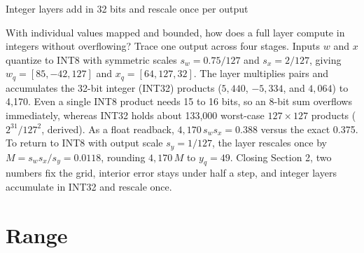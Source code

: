 \documentclass[aspectratio=169, 12pt]{beamer}
\begin{document}
\begin{frame}{Integer layers add in 32 bits and rescale once per output}
{    With individual values mapped and bounded, how does a full layer compute in integers without overflowing? Trace one output across four stages. Inputs $w$ and $x$ quantize to INT8 with symmetric scales $s_w = 0.75/127$ and $s_x = 2/127$, giving $w_q = [85, -42, 127]$ and $x_q = [64, 127, 32]$. The layer multiplies pairs and accumulates the 32-bit integer (INT32) products ($5{,}440$, $-5{,}334$, and $4{,}064$) to 4,170. Even a single INT8 product needs 15 to 16 bits, so an 8-bit sum overflows immediately, whereas INT32 holds about 133,000 worst-case $127\times 127$ products ($2^{31}/127^2$, derived). As a float readback, $4{,}170\,s_w s_x = 0.388$ versus the exact 0.375. To return to INT8 with output scale $s_y = 1/127$, the layer rescales once by $M = s_w s_x / s_y = 0.0118$, rounding $4{,}170\,M$ to $y_q = 49$. Closing Section 2, two numbers fix the grid, interior error stays under half a step, and integer layers accumulate in INT32 and rescale once.


  }
\end{frame}

\section{Range}
\end{document}
